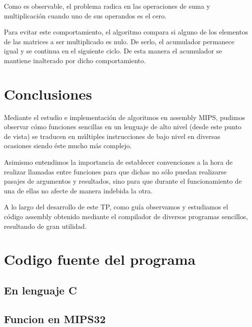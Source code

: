 \documentclass[10pt,a4paper]{article}
\begin{document}
		Como es observable, el problema radica en las operaciones de suma y multiplicación cuando uno de sus operandos es el cero. 

		Para evitar este comportamiento, el algoritmo compara si alguno de los elementos de las matrices a ser multiplicado es nulo. De serlo, el acumulador permanece igual y se continua en el siguiente ciclo. De esta manera el acumulador se mantiene inalterado por dicho comportamiento.

\section{Conclusiones}
	Mediante el estudio e implementación de algoritmos en assembly MIPS, pudimos observar cómo funciones sencillas en un lenguaje de alto nivel (desde este punto de vista) se traducen en múltiples instrucciones de bajo nivel en diversas ocasiones siendo éste mucho más complejo.

	Asimismo entendimos la importancia de establecer convenciones a la hora de realizar llamadas entre funciones para que dichas no sólo puedan realizarse pasajes de argumentos y resultados, sino para que durante el funcionamiento de una de ellas no afecte de manera indebida la otra.

	A lo largo del desarrollo de este TP, como guía observamos y estudiamos el código assembly obtenido mediante el compilador de diversos programas sencillos, resultando de gran utilidad.

\newpage
\section{Codigo fuente del programa}

\subsection{En lenguaje C}



\newpage
\subsection{Funcion en MIPS32}



\newpage\thispagestyle{empty}


\end{document}
